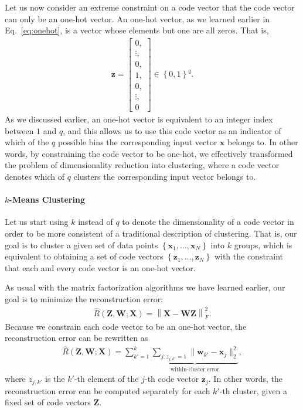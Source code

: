 \documentclass{report}
\newcommand{\vect}[1]{\mathbf{#1}}
\newcommand{\matr}[1]{\mathbf{#1}}
\newcommand{\vx}[0]{\vect{x}}
\newcommand{\vz}[0]{\vect{z}}
\newcommand{\vw}[0]{\vect{w}}
\newcommand{\mW}[0]{\matr{W}}
\newcommand{\mZ}[0]{\matr{Z}}
\newcommand{\mX}[0]{\matr{X}}
\begin{document}
Let us now consider an extreme constraint on a code vector that the code vector
can only be an one-hot vector. An one-hot vector, as we learned earlier in
Eq.~\eqref{eq:onehot}, is a vector whose elements but one are all zeros. That
is, 
\begin{align}
    \label{eq:onehot}
    \vz = 
    \left[ 
        \begin{array}{c}
            0, \\
            \vdots, \\
            0, \\
            1, \\
            0, \\
            \vdots, \\
            0
        \end{array}
    \right] \in \left\{ 0, 1\right\}^q.
\end{align}
As we discussed earlier, an one-hot vector is equivalent to an integer index
between $1$ and $q$, and this allows us to use this code vector as an indicator
of which of the $q$ possible bins the corresponding input vector $\vx$ belongs
to. In other words, by constraining the code vector to be one-hot, we
effectively transformed the problem of dimensionality reduction into clustering,
where a code vector denotes which of $q$ clusters the corresponding input vector
belongs to.

\paragraph{$k$-Means Clustering}

Let us start using $k$ instead of $q$ to denote the dimensionality of a code
vector in order to be more consistent of a traditional description of
clustering. That is, our goal is to cluster a given set of data points $\left\{
    \vx_1, \ldots, \vx_N
\right\}$ into $k$ groups, which is equivalent to obtaining a set of code
vectors $\left\{ \vz_1, \ldots, \vz_N \right\}$ with the constraint that each
and every code vector is an one-hot vector. 

As usual with the matrix factorization algorithms we have learned earlier, our
goal is to minimize the reconstruction error:
\begin{align*}
    \hat{R}(\mZ, \mW; \mX) = \left\| \mX - \mW \mZ \right\|_F^2.
\end{align*}
Because we constrain each code vector to be an one-hot vector, the
reconstruction error can be rewritten as
\begin{align*}
    \hat{R}(\mZ, \mW; \mX) = 
    \sum_{k'=1}^k \underbrace{
        \sum_{j: z_{j,k'} = 1} \| \vw_{k'} - \vx_j \|_2^2
}_{
        \text{within-cluster error}
    },
\end{align*}
where $z_{j,k'}$ is the $k'$-th element of the $j$-th code vector $\vz_j$. In
other words, the reconstruction error can be computed separately for each
$k'$-th cluster, given a fixed set of code vectors $\mZ$.
\end{document}
